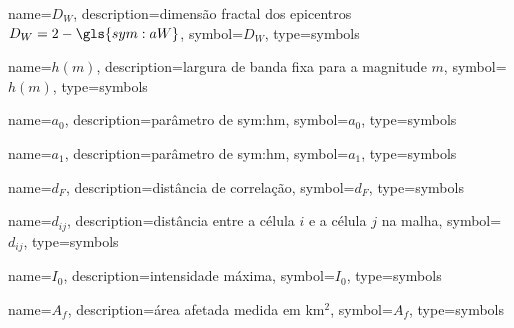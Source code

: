 {
	name={\ensuremath{D_W}},
	description={dimensão fractal dos epicentros $D_W = 2-\gls{sym:aW}$}, 
	symbol={\ensuremath{D_W}}, 
	type=symbols
}



{
	name={\ensuremath{h(m)}},
	description={largura de banda fixa para a magnitude $m$}, 
	symbol={\ensuremath{h(m)}}, 
	type=symbols
}



{
	name={\ensuremath{a_0}},
	description={parâmetro de \gls{sym:hm}}, 
	symbol={\ensuremath{a_0}}, 
	type=symbols
}



{
	name={\ensuremath{a_1}},
	description={parâmetro de \gls{sym:hm}}, 
	symbol={\ensuremath{a_1}}, 
	type=symbols
}




{
	name={\ensuremath{d_F}},
	description={distância de correlação}, 
	symbol={\ensuremath{d_F}}, 
	type=symbols
}


{
	name={\ensuremath{d_{ij}}},
	description={distância entre a célula $i$ e a célula $j$ na malha}, 
	symbol={\ensuremath{d_{ij}}}, 
	type=symbols
}


{
	name={\ensuremath{I_0}},
	description={intensidade máxima}, 
	symbol={\ensuremath{I_0}}, 
	type=symbols
}


{
	name={\ensuremath{A_{f}}},
	description={área afetada medida em km$^2$}, 
	symbol={\ensuremath{A_{f}}}, 
	type=symbols
}



